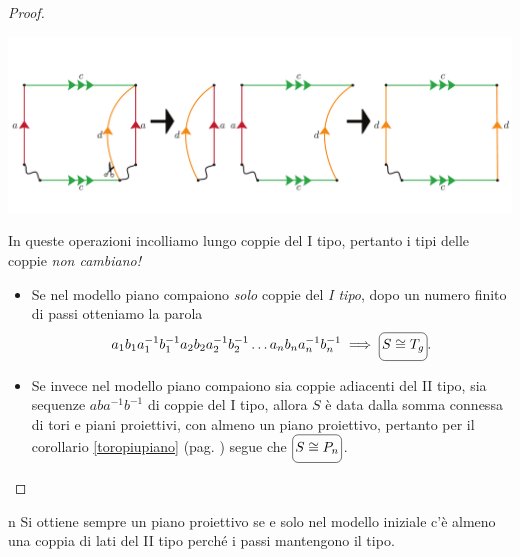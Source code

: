 \begin{proof}{}
\begin{enumerate}
	\begin{center}
		\includegraphics[trim=0cm 0cm 0cm 0cm, clip, scale=0.35]{images/cutandpastealgorithmstep4-4.pdf}
	\end{center}
\end{enumerate}
In queste operazioni incolliamo lungo coppie del I tipo, pertanto i tipi delle coppie \textit{non cambiano!}
\begin{itemize}
	\item Se nel modello piano compaiono \textit{solo} coppie del \textit{I tipo}, dopo un numero finito di passi otteniamo la parola
	\begin{equation*}
		a_1b_1a_1^{-1}b_1^{-1}a_2b_2a_2^{-1}b_2^{-1}\ldots a_nb_na_n^{-1}b_n^{-1}\implies \ovaled{S\cong T_g}.
	\end{equation*}
	\item Se invece nel modello piano compaiono sia coppie adiacenti del II tipo, sia sequenze $aba^{-1}b^{-1}$ di coppie del I tipo, allora $S$ è data dalla somma connessa di tori e piani proiettivi, con almeno un piano proiettivo, pertanto per il corollario \ref{toropiupiano} (pag. \pageref{toropiupiano}) segue che $\ovaled{S\cong P_n}$.\qedhere
\end{itemize}
\end{proof}
\begin{remark}{n}
	Si ottiene sempre un piano proiettivo se e solo nel modello iniziale c'è almeno una coppia di lati del II tipo perché i passi mantengono il tipo.
\end{remark}

